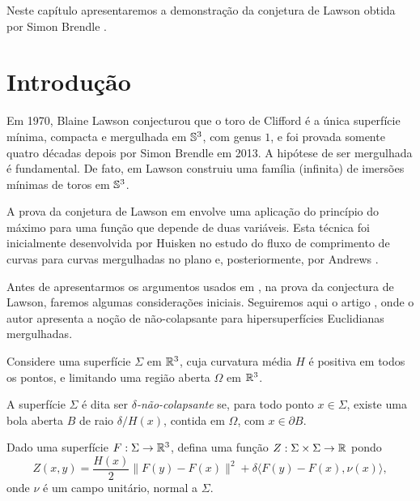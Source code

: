 Neste capítulo apresentaremos a demonstração da conjetura de
Lawson obtida por Simon Brendle \cite{Brendle2013a}.


\section{Introdu\c c\~ao}

Em 1970, Blaine Lawson \cite{Lawson1970a} conjecturou que o toro de 
Clifford é a única superfície mínima, compacta e mergulhada em $\mathbb{S}^3$,
com genus $1$, e foi provada somente quatro décadas depois por Simon
Brendle \cite{Brendle2013a} em 2013. A hipótese de ser mergulhada é
fundamental. De fato, em \cite{Lawson1970} Lawson construiu uma 
família (infinita) de imersões mínimas de toros em $\mathbb{S}^3$.

A prova da conjetura de Lawson em \cite{Brendle2013a} envolve uma 
aplicação do princípio do máximo para uma função que depende de 
duas vari\'aveis. Esta técnica foi inicialmente desenvolvida por Huisken
\cite{Huisken1998} no estudo do fluxo de comprimento de curvas para 
curvas mergulhadas no plano e, posteriormente, por Andrews 
\cite{Andrews2012}.

Antes de apresentarmos os argumentos usados em \cite{Brendle2013a},
na prova da conjectura de Lawson, faremos algumas considera\c c\~oes
iniciais. Seguiremos aqui o artigo \cite{Andrews2012}, onde o autor
apresenta a no\c c\~ao de n\~ao-colapsante para hipersuperf\'icies
Euclidianas mergulhadas.

Considere uma superf\'icie $\Sigma$ em $\mathbb{R}^3$, cuja curvatura
m\'edia $H$ \'e positiva em todos os pontos, e limitando uma 
regi\~ao aberta $\Omega$ em $\mathbb{R}^3$.

\begin{definicao}
A superf\'icie $\Sigma$ \'e dita ser {\em $\delta$-n\~ao-colapsante}
se, para todo ponto $x\in\Sigma$, existe uma bola aberta $B$ de
raio $\delta/H(x)$, contida em $\Omega$, com $x\in\partial B$. 
\end{definicao}

Dado uma superf\'icie $F:\Sigma\to\mathbb{R}^3$, defina uma fun\c c\~ao
$Z:\Sigma\times\Sigma\to\mathbb{R}$ pondo
\[
Z(x,y) = \frac{H(x)}{2}\|F(y)-F(x)\|^2 + \delta\langle F(y)-F(x), \nu(x)\rangle,
\]
onde $\nu$ \'e um campo unit\'ario, normal a $\Sigma$.

